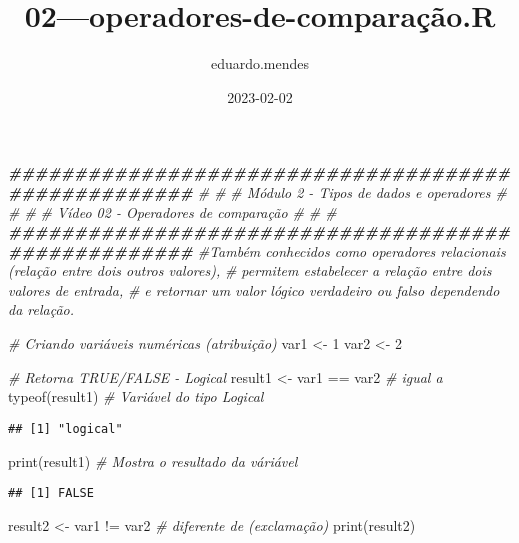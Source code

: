 \documentclass[
]{article}
\title{02---operadores-de-comparação.R}
\author{eduardo.mendes}
\date{2023-02-02}
\newenvironment{Shaded}{\begin{snugshade}}{\end{snugshade}}
\newcommand{\CommentTok}[1]{\textcolor[rgb]{0.56,0.35,0.01}{\textit{#1}}}
\newcommand{\DecValTok}[1]{\textcolor[rgb]{0.00,0.00,0.81}{#1}}
\newcommand{\DocumentationTok}[1]{\textcolor[rgb]{0.56,0.35,0.01}{\textbf{\textit{#1}}}}
\newcommand{\FunctionTok}[1]{\textcolor[rgb]{0.00,0.00,0.00}{#1}}
\newcommand{\NormalTok}[1]{#1}
\newcommand{\OtherTok}[1]{\textcolor[rgb]{0.56,0.35,0.01}{#1}}
\newcommand{\SpecialCharTok}[1]{\textcolor[rgb]{0.00,0.00,0.00}{#1}}
\begin{document}
\maketitle

\begin{Shaded}
\begin{Highlighting}[]
\DocumentationTok{\#\#\#\#\#\#\#\#\#\#\#\#\#\#\#\#\#\#\#\#\#\#\#\#\#\#\#\#\#\#\#\#\#\#\#\#\#\#\#\#\#\#\#\#\#\#\#\#\#\#\#\#}
\CommentTok{\#                                                  \#  }
\CommentTok{\# Módulo 2 {-} Tipos de dados e operadores           \#}
\CommentTok{\#                                                  \#}
\CommentTok{\# Vídeo 02 {-} Operadores de comparação              \#}
\CommentTok{\#                                                  \#}
\DocumentationTok{\#\#\#\#\#\#\#\#\#\#\#\#\#\#\#\#\#\#\#\#\#\#\#\#\#\#\#\#\#\#\#\#\#\#\#\#\#\#\#\#\#\#\#\#\#\#\#\#\#\#\#\#}
\CommentTok{\#Também conhecidos como operadores relacionais (relação entre dois outros valores), }
\CommentTok{\# permitem estabelecer a relação entre dois valores de entrada, }
\CommentTok{\# e retornar um valor lógico verdadeiro ou falso dependendo da relação. }

\CommentTok{\# Criando variáveis numéricas (atribuição)}
\NormalTok{var1 }\OtherTok{\textless{}{-}} \DecValTok{1} 
\NormalTok{var2 }\OtherTok{\textless{}{-}} \DecValTok{2} 

\CommentTok{\# Retorna TRUE/FALSE {-} Logical}
\NormalTok{result1 }\OtherTok{\textless{}{-}}\NormalTok{ var1 }\SpecialCharTok{==}\NormalTok{ var2 }\CommentTok{\# igual a }
\FunctionTok{typeof}\NormalTok{(result1) }\CommentTok{\# Variável do tipo Logical}
\end{Highlighting}
\end{Shaded}

\begin{verbatim}
## [1] "logical"
\end{verbatim}

\begin{Shaded}
\begin{Highlighting}[]
\FunctionTok{print}\NormalTok{(result1)  }\CommentTok{\# Mostra o resultado da váriável}
\end{Highlighting}
\end{Shaded}

\begin{verbatim}
## [1] FALSE
\end{verbatim}

\begin{Shaded}
\begin{Highlighting}[]
\NormalTok{result2 }\OtherTok{\textless{}{-}}\NormalTok{ var1 }\SpecialCharTok{!=}\NormalTok{ var2 }\CommentTok{\# diferente de (exclamação)}
\FunctionTok{print}\NormalTok{(result2)}
\end{Highlighting}
\end{Shaded}
\end{document}
